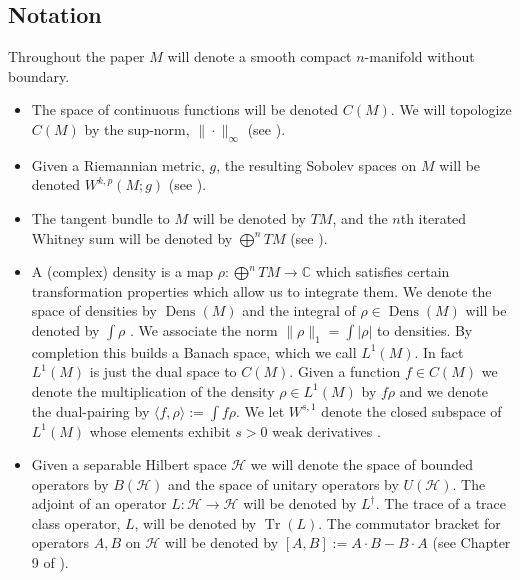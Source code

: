\documentclass[final,leqno]{siamltex1213}
\DeclareMathOperator{\Dens}{Dens}
\DeclareMathOperator{\Tr}{Tr}
\begin{document}
\subsection{Notation}
Throughout the paper $M$ will denote a smooth compact $n$-manifold without boundary.
\begin{itemize}
	\item The space of continuous functions will be denoted $C(M)$.
	We will topologize $C(M)$ by the sup-norm, $\| \cdot \|_{\infty}$ (see \cite{Taylor1974,Rudin1991,MTA,Conway1990}).
	\item Given a Riemannian metric, $g$, the resulting Sobolev spaces on $M$ will be denoted $W^{k,p}(M ; g)$ (see \cite{Hebey1999}).
	\item The tangent bundle to $M$ will be denoted by $TM$, and the $n$th iterated Whitney sum will be denoted by $\bigoplus^{n} TM$ (see \cite{Lee2006,MTA}).
	\item A (complex) density is a map $\rho: \bigoplus^{n}TM \to \mathbb{C}$ which satisfies certain transformation properties which allow us to integrate them.
	We denote the space of densities by $\Dens(M)$ and the integral of $\rho \in \Dens(M)$ will be denoted by $\int \rho$ \cite[Chapter 16]{Lee2006}.
	We associate the norm $\| \rho \|_{1} =  \int | \rho |$ to densities.  By completion this builds a Banach space, which we call $L^{1}(M)$.
	In fact $L^{1}(M)$ is just the dual space to $C(M)$.  Given a function $f \in C(M)$ we denote the multiplication of the density $\rho \in L^{1}(M)$ by $f \rho$
	and we denote the dual-pairing by $\langle f , \rho \rangle := \int f \rho$.
	We let $W^{s,1}$ denote the closed subspace of $L^{1}(M)$ whose elements exhibit $s>0$ weak derivatives \cite{Hormander2003}.
	\item Given a separable Hilbert space $\mathcal{H}$ we will denote the space of bounded operators by $B( \mathcal{H})$
	and the space of unitary operators by $U( \mathcal{H})$.
	The adjoint of an operator $L : \mathcal{H} \to \mathcal{H}$ will be denoted by $L^{\dagger}$.
	The trace of a trace class operator, $L$, will be denoted by $\Tr(L)$.
	The commutator bracket for operators $A,B$ on $\mathcal{H}$ will be denoted by $[A,B] := A \cdot B - B \cdot A$ (see Chapter 9 of \cite{Conway1990}).
\end{itemize}
\end{document}
